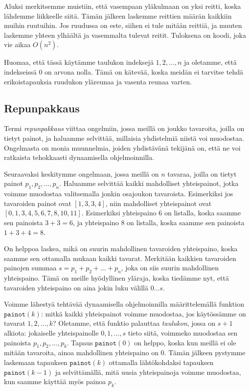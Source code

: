 Aluksi merkitsemme muistiin, että vasempaan yläkulmaan on yksi reitti,
koska lähdemme liikkeelle siitä.
Tämän jälkeen laskemme reittien määrän kaikkiin muihin ruutuihin.
Jos ruudussa on este, siihen ei tule mitään reittiä,
ja muuten laskemme yhteen ylhäältä ja vasemmalta tulevat reitit.
Tuloksena on koodi, joka vie aikaa $O(n^2)$.

Huomaa, että tässä käytämme taulukon indeksejä $1,2,\dots,n$
ja oletamme, että indekseissä $0$ on arvona nolla.
Tämä on kätevää, koska meidän ei tarvitse tehdä erikoistapauksia
ruudukon yläreunaa ja vasenta reunaa varten.

\subsection{Repunpakkaus}

Termi \emph{repunpakkaus} viittaa ongelmiin, jossa meillä on joukko
tavaroita, joilla on tietyt painot, 
ja haluamme selvittää, millaisia yhdistelmiä niistä voi muodostaa.
Ongelmasta on monia muunnelmia, joiden yhdistävänä tekijänä on,
että ne voi ratkaista tehokkaasti dynaamisella ohjelmoinnilla.

Seuraavaksi keskitymme ongelmaan, jossa meillä on $n$ tavaraa,
joilla on tietyt painot $p_1,p_2,\dots,p_n$.
Haluamme selvittää kaikki mahdolliset yhteispainot,
jotka voimme muodostaa valitsemalla jonkin osajoukon tavaroista.
Esimerkiksi jos tavaroiden painot ovat $[1,3,3,4]$,
niin mahdolliset yhteispainot ovat $[0,1,3,4,5,6,7,8,10,11]$.
Esimerkiksi yhteispaino $6$ on listalla,
koska saamme sen painoista $3+3=6$,
ja yhteispaino $8$ on listalla,
koska saamme sen painoista $1+3+4=8$.

On helppoa laskea, mikä on suurin mahdollinen tavaroiden yhteispaino,
koska saamme sen ottamalla mukaan kaikki tavarat.
Merkitään kaikkien tavaroiden painojen summaa $s=p_1+p_2+\dots+p_n$,
joka on siis suurin mahdollinen yhteispaino.
Tämä on meille hyödyllinen yläraja, koska tiedämme nyt,
että tavaroiden yhteispaino on aina jokin luku välillä $0 \dots s$.

Voimme lähestyä tehtävää dynaamisella ohjelmoinnilla määrittelemällä
funktion $\texttt{painot}(k)$: mitkä kaikki yhteispainot voimme
muodostaa, jos käytös\-sämme on tavarat $1,2,\dots,k$?
Oletamme, että funktio palauttaa \emph{taulukon}, jossa on $s+1$ alkiota:
jokaiselle yhteispainolle $0,1,\dots,s$ tieto siitä,
voimmeko muodostaa sen painoista $p_1,p_2,\dots,p_k$.
Tapaus $\texttt{painot}(0)$ on helppo,
koska kun meillä ei ole mitään tavaroita,
ainoa mahdollinen yhteispaino on $0$.
Tämän jälkeen pystymme laskemaan tapauksen $\texttt{painot}(k)$
ottamalla lähtökohdaksi tapauksen $\texttt{painot}(k-1)$
ja selvittämällä, mitä uusia yhteispainoja voimme muodostaa,
kun saamme käyttää myös painoa $p_k$.


